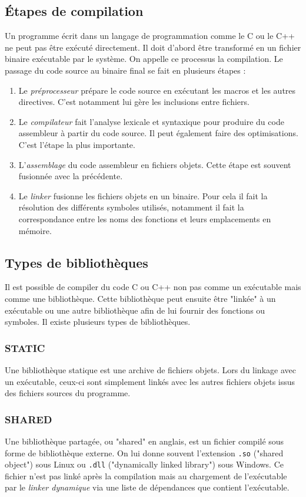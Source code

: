 \documentclass[a4paper,11pt]{report}
\begin{document}
\subsection{Étapes de compilation}
Un programme écrit dans un langage de programmation comme le C ou le C++ ne peut pas être exécuté directement.
Il doit d'abord être transformé en un fichier binaire exécutable par le système.
On appelle ce processus la compilation.
Le passage du code source au binaire final se fait en plusieurs étapes :
\begin{enumerate}
    \item Le \emph{préprocesseur} prépare le code source en exécutant les macros et les autres directives.
          C'est notamment lui gère les inclusions entre fichiers.
    \item Le \emph{compilateur} fait l'analyse lexicale et syntaxique pour produire du code assembleur à partir du code source.
          Il peut également faire des optimisations.
          C'est l'étape la plus importante.
    \item L'\emph{assemblage} du code assembleur en fichiers objets.
          Cette étape est souvent fusionnée avec la précédente.
    \item Le \emph{linker} fusionne les fichiers objets en un binaire.
          Pour cela il fait la résolution des différents symboles utilisés, notamment il fait la correspondance entre les noms des fonctions et leurs emplacements en mémoire.
\end{enumerate}

\subsection{Types de bibliothèques}\label{section:static}
Il est possible de compiler du code C ou C++ non pas comme un exécutable mais comme une bibliothèque.
Cette bibliothèque peut ensuite être "linkée" à un exécutable ou une autre bibliothèque afin de lui fournir des fonctions ou symboles.
Il existe plusieurs types de bibliothèques.

\subsubsection{STATIC}
Une bibliothèque statique est une archive de fichiers objets.
Lors du linkage avec un exécutable, ceux-ci sont simplement linkés avec les autres fichiers objets issus des fichiers sources du programme.

\subsubsection{SHARED}
Une bibliothèque partagée, ou "shared" en anglais, est un fichier compilé sous forme de bibliothèque externe.
On lui donne souvent l'extension \verb'.so' ("shared object") sous Linux ou \verb'.dll' ("dynamically linked library") sous Windows.
Ce fichier n'est pas linké après la compilation mais au chargement de l'exécutable par le \emph{linker dynamique} via une liste de dépendances que contient l'exécutable.
\end{document}

